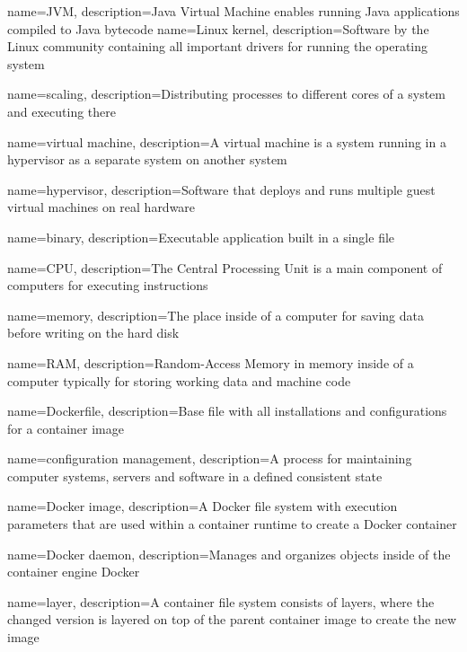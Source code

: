 {
    name={JVM},
    description={Java Virtual Machine enables running Java applications compiled to Java bytecode}
}
{
    name={Linux kernel},
    description={Software by the Linux community containing all important drivers for running the operating system}
}

{
    name={scaling},
    description={Distributing processes to different cores of a system and executing there}
}

{
    name={virtual machine},
    description={A virtual machine is a system running in a hypervisor as a separate system on another system}
}

{
    name={hypervisor},
    description={Software that deploys and runs multiple guest virtual machines on real hardware}
}


{
    name={binary},
    description={Executable application built in a single file}
}

{
    name={CPU},
    description={The Central Processing Unit is a main component of computers for executing instructions}
}

{
    name={memory},
    description={The place inside of a computer for saving data before writing on the hard disk}
}

{
    name={RAM},
    description={Random-Access Memory in memory inside of a computer typically for storing working data and machine code}
}

{
    name={Dockerfile},
    description={Base file with all installations and configurations for a container image}
}

{
    name={configuration management},
    description={A process for maintaining computer systems, servers and software in a defined consistent state}
}

{
    name={Docker image},
    description={A Docker file system with execution parameters that are used within a container runtime to create a Docker container}
}

{
    name={Docker daemon},
    description={Manages and organizes objects inside of the container engine Docker}
}

{
    name={layer},
    description={A container file system consists of layers, where the changed version is layered on top of the parent container image to create the new image}
}

